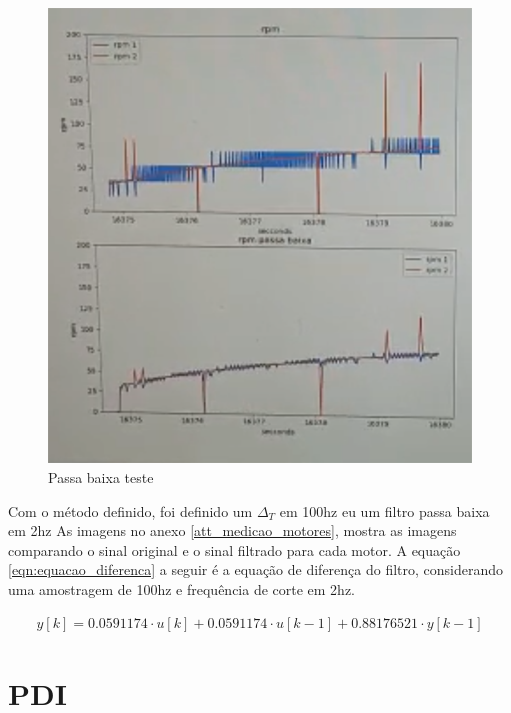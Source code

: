 \begin{figure}[h]
	\centering
	\includegraphics{figures/passa_baixa_teste}
	\caption{Passa baixa teste}
	\label{fig:passa_baixa_teste}
\end{figure}

Com o método definido, foi definido um $\Delta_{T}$ em 100hz eu um filtro passa baixa em 2hz
As imagens no anexo \ref{att_medicao_motores}, mostra as imagens comparando o sinal original e o sinal filtrado para cada motor.
A equação \ref{eqn:equacao_diferenca} a seguir é a equação de diferença do filtro, considerando uma amostragem de 100hz e frequência de corte em 2hz.

\begin{equation}
    \begin{split}
        y[k] = 0.0591174 \cdot u \left[ k \right] +  0.0591174 \cdot u[k - 1] + 0.88176521 \cdot y[k - 1]
    \end{split}
    \label{eqn:equacao_diferenca}
\end{equation}



\section{PDI}